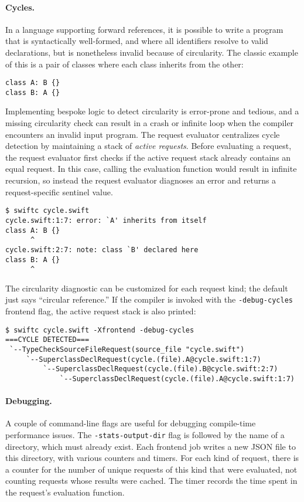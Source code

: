\documentclass[../generics]{subfiles}
\begin{document}
\paragraph{Cycles.} In a language supporting forward references, it is possible to write a program that is syntactically well-formed, and where all identifiers resolve to valid declarations, but is nonetheless invalid because of circularity. The classic example of this is a pair of classes where each class inherits from the other:
\begin{Verbatim}
class A: B {}
class B: A {}
\end{Verbatim}
Implementing bespoke logic to detect circularity is error-prone and tedious, and a missing circularity check can result in a crash or infinite loop when the compiler encounters an invalid input program. The request evaluator centralizes cycle detection by maintaining a stack of \emph{active requests}. Before evaluating a request, the request evaluator first checks if the active request stack already contains an equal request. In this case, calling the evaluation function would result in infinite recursion, so instead the request evaluator diagnoses an error and returns a request-specific sentinel value.
\begin{Verbatim}
$ swiftc cycle.swift
cycle.swift:1:7: error: `A' inherits from itself
class A: B {}
      ^
cycle.swift:2:7: note: class `B' declared here
class B: A {}
      ^
\end{Verbatim}

The circularity diagnostic can be customized for each request kind; the default just says ``circular reference.'' If the compiler is invoked with the \texttt{-debug-cycles} frontend flag, the active request stack is also printed:
\begin{Verbatim}
$ swiftc cycle.swift -Xfrontend -debug-cycles
===CYCLE DETECTED===
 `--TypeCheckSourceFileRequest(source_file "cycle.swift")
     `--SuperclassDeclRequest(cycle.(file).A@cycle.swift:1:7)
         `--SuperclassDeclRequest(cycle.(file).B@cycle.swift:2:7)
             `--SuperclassDeclRequest(cycle.(file).A@cycle.swift:1:7)
\end{Verbatim}

\paragraph{Debugging.} A couple of command-line flags are useful for debugging compile-time performance issues. The \texttt{-stats-output-dir} flag is followed by the name of a directory, which must already exist. Each frontend job writes a new JSON file to this directory, with various counters and timers. For each kind of request, there is a counter for the number of unique requests of this kind that were evaluated, not counting requests whose results were cached. The timer records the time spent in the request's evaluation function.
\end{document}
